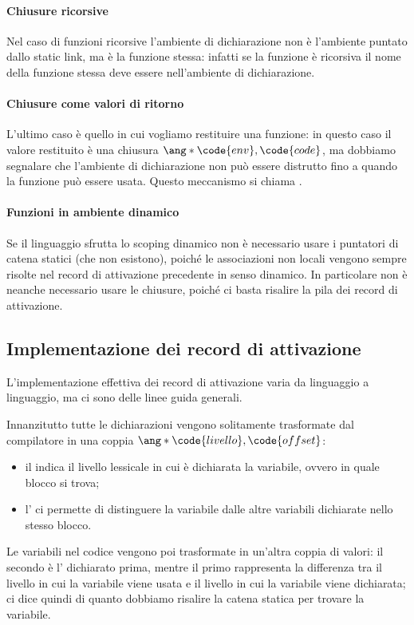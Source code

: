 \paragraph{Chiusure ricorsive}
Nel caso di funzioni ricorsive l'ambiente di dichiarazione non è l'ambiente puntato dallo static link, ma è la funzione stessa: infatti se la funzione è ricorsiva il nome della funzione stessa deve essere nell'ambiente di dichiarazione.

\paragraph{Chiusure come valori di ritorno}
L'ultimo caso è quello in cui vogliamo restituire una funzione: in questo caso il valore restituito è una chiusura $\ang*{\code{env}, \code{code}}$, ma dobbiamo segnalare che l'ambiente di dichiarazione  non può essere distrutto fino a quando la funzione può essere usata. Questo meccanismo si chiama . 

\paragraph{Funzioni in ambiente dinamico}

Se il linguaggio sfrutta lo scoping dinamico non è necessario usare i puntatori di catena statici (che non esistono), poiché le associazioni non locali vengono sempre risolte nel record di attivazione precedente in senso dinamico. In particolare non è neanche necessario usare le chiusure, poiché ci basta risalire la pila dei record di attivazione.

\subsection*{Implementazione dei record di attivazione}

L'implementazione effettiva dei record di attivazione varia da linguaggio a linguaggio, ma ci sono delle linee guida generali.

Innanzitutto tutte le dichiarazioni vengono solitamente trasformate dal compilatore in una coppia $\ang*{\code{livello}, \code{offset}}$: \begin{itemize}
    \item il  indica il livello lessicale in cui è dichiarata la variabile, ovvero in quale blocco si trova;
    \item l' ci permette di distinguere la variabile dalle altre variabili dichiarate nello stesso blocco.
\end{itemize}

Le variabili nel codice vengono poi trasformate in un'altra coppia di valori: il secondo è l' dichiarato prima, mentre il primo rappresenta la differenza tra il livello in cui la variabile viene usata e il livello in cui la variabile viene dichiarata; ci dice quindi di quanto dobbiamo risalire la catena statica per trovare la variabile.